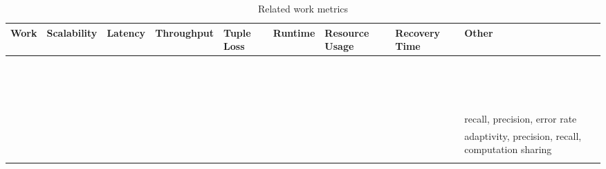 \documentclass[ppgc,diss,english]{iiufrgs}
\begin{document}
\begin{table}[t]
\begin{center}
	\footnotesize
	\begin{tabular}{ | l | >{\centering\arraybackslash}p{1.5cm} | c | c | >{\centering\arraybackslash}p{1cm} | c | >{\centering\arraybackslash}p{1.5cm} | >{\centering\arraybackslash}p{1.5cm} | >{\centering\arraybackslash}p{1.5cm} |}
   		\hline
        \textbf{Work} & \textbf{Scalability} & \textbf{Latency} & \textbf{Throughput} & \textbf{Tuple Loss} & \textbf{Runtime} & \textbf{Resource Usage} & \textbf{Recovery Time} & \textbf{Other} \\\hline
   		
		\cite{dayarathna2011performance} & \textbullet & & \textbullet & & & & & \\\hline
		\cite{dayarathna2013performance} & & & \textbullet & & & \textbullet & & \\\hline
		\cite{zaharia2012discretized} & \textbullet & & \textbullet & & \textbullet & & & \\\hline
		\cite{chauhan2012performance} & \textbullet & & \textbullet & \textbullet & & \textbullet & & \\\hline
		\cite{akidau2013millwheel} & \textbullet & \textbullet & & & & & & \\\hline
		\cite{qian2013timestream} & \textbullet & \textbullet & \textbullet & & & & \textbullet & \\\hline
		\cite{castro2013integrating} & & \textbullet & & & & & \textbullet & \\\hline
		\cite{de2011watershed} & & & \textbullet & & \textbullet & & & \\\hline
		\cite{gulisano2012streamcloud} & \textbullet & & \textbullet & & & \textbullet & & \\\hline
		\cite{chardonnens2013big} & & & & & \textbullet & & & \\\hline
		\cite{smit2013distributed} & \textbullet & \textbullet & \textbullet & & & & & \\\hline
		\cite{heinzeelastic} & & \textbullet & & & & & & \\\hline
		\cite{wahl2012performance} & & \textbullet & & & & \textbullet & & \\\hline
		\cite{le2012linked} & \textbullet & & \textbullet & & & & & \\\hline
		\cite{li2014cepben} & & \textbullet & \textbullet & & & & & \\\hline
		\cite{scharrenbach2013seven} & & \textbullet & \textbullet & & & & & recall, precision, error rate\\\hline
		\cite{bizarro2007bicep} & \textbullet & \textbullet & & & & & & adaptivity, precision, recall, computation sharing \\\hline
		\cite{lu2014stream} & \textbullet & \textbullet & \textbullet & & & & & \\\hline
	\end{tabular}
	\vspace{5px}
	\caption{Related work metrics}
	\label{table:related_work_metrics}
\end{center}
\end{table}
\end{document}
